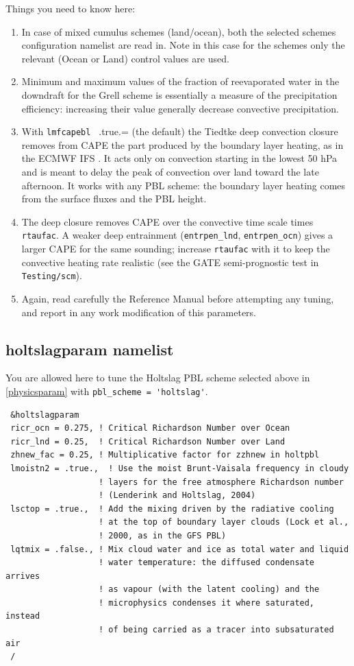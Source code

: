 Things you need to know here:

\begin{enumerate}
\item In case of mixed cumulus schemes (land/ocean), both the selected
schemes configuration namelist are read in.  Note in this case for the
schemes only the relevant (Ocean or Land) control values are used.
\item Minimum and maximum values of the fraction of reevaporated water in the
downdraft for the Grell scheme is essentially a measure of the precipitation
efficiency: increasing their value generally decrease convective precipitation.
\item With \verb=lmfcapebl = .true.= (the default) the Tiedtke deep
convection closure removes from CAPE the part produced by the boundary layer heating, as in the
ECMWF IFS \citep{Bechtold_14}. It acts only on convection starting in the
lowest 50 hPa and is meant to delay the peak of convection over land toward
the late afternoon. It works with any PBL scheme: the boundary layer heating
comes from the surface fluxes and the PBL height.
\item The deep closure removes CAPE over the convective time scale times
\verb=rtaufac=. A weaker deep entrainment (\verb=entrpen_lnd=,
\verb=entrpen_ocn=) gives a larger CAPE for the same sounding; increase
\verb=rtaufac= with it to keep the convective heating rate realistic (see
the GATE semi-prognostic test in \verb=Testing/scm=).
\item Again, read carefully the Reference Manual before attempting any tuning,
and report in any work modification of this parameters.
\end{enumerate}

\subsection{holtslagparam namelist}

You are allowed here to tune the Holtslag PBL scheme selected above in
\ref{physicsparam} with \verb|pbl_scheme = 'holtslag'|.

{\footnotesize
\begin{Verbatim}
 &holtslagparam
 ricr_ocn = 0.275, ! Critical Richardson Number over Ocean
 ricr_lnd = 0.25,  ! Critical Richardson Number over Land
 zhnew_fac = 0.25, ! Multiplicative factor for zzhnew in holtpbl
 lmoistn2 = .true.,  ! Use the moist Brunt-Vaisala frequency in cloudy
                   ! layers for the free atmosphere Richardson number
                   ! (Lenderink and Holtslag, 2004)
 lsctop = .true.,  ! Add the mixing driven by the radiative cooling
                   ! at the top of boundary layer clouds (Lock et al.,
                   ! 2000, as in the GFS PBL)
 lqtmix = .false., ! Mix cloud water and ice as total water and liquid
                   ! water temperature: the diffused condensate arrives
                   ! as vapour (with the latent cooling) and the
                   ! microphysics condenses it where saturated, instead
                   ! of being carried as a tracer into subsaturated air
 /
\end{Verbatim}
}

